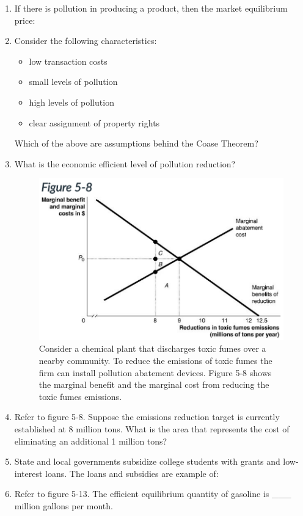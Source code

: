 \begin{enumerate}
    \item If there is pollution in producing a product, then the market equilibrium price:
    \item Consider the following characteristics:
    \begin{itemize}
        \item low transaction costs
        \item small levels of pollution
        \item high levels of pollution
        \item clear assignment of property rights
    \end{itemize}
    Which of the above are assumptions behind the Coase Theorem?
    \item What is the economic efficient level of pollution reduction?
    \begin{figure}[h!]
        \includegraphics{images/fig5-8.png}
        \caption{Consider a chemical plant that discharges toxic fumes over a nearby community.
        To reduce the emissions of toxic fumes the firm can install pollution abatement devices.
        Figure 5-8 shows the marginal benefit and the marginal cost from reducing the toxic fumes emissions.}
    \end{figure}
    \item Refer to figure 5-8.
    Suppose the emissions reduction target is currently established at 8 million tons.
    What is the area that represents the cost of eliminating an additional 1 million tons?
    \item State and local governments subsidize college students with grants and low-interest loans.
    The loans and subsidies are example of:
    \item Refer to figure 5-13.
    The efficient equilibrium quantity of gasoline is \_\_\_ million gallons per month.
    \begin{figure}[h!]

\end{figure}
\end{enumerate}
